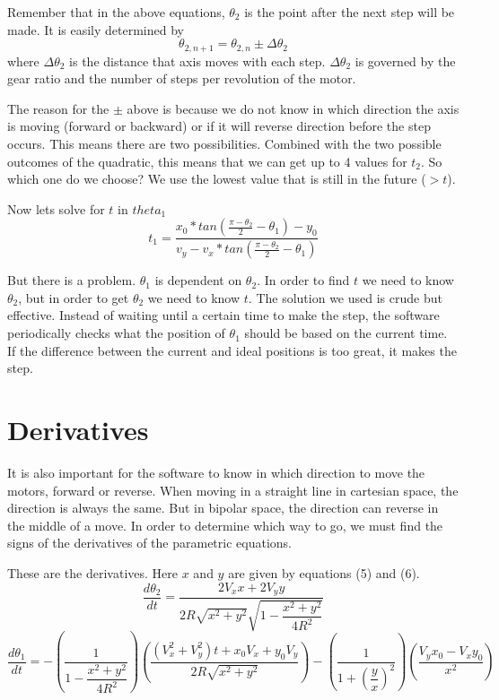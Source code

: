 \documentclass[12pt,letterpaper]{report}
\begin{document}
Remember that in the above equations, $\theta_2$ is the point after the next step will be made. It is easily determined by
\begin{equation}
	\theta_{2,n+1} = \theta_{2,n} \pm \Delta\theta_2
\end{equation}
where $\Delta\theta_2$ is the distance that axis moves with each step. $\Delta\theta_2$ is governed by the gear ratio and the number of steps per revolution of the motor.

The reason for the $\pm$ above is because we do not know in which direction the axis is moving (forward or backward) or if it will reverse direction before the step occurs. This means there are two possibilities. Combined with the two possible outcomes of the quadratic, this means that we can get up to 4 values for $t_2$. So which one do we choose? We use the lowest value that is still in the future ($> t$).

Now lets solve for $t$ in $theta_1$
\begin{equation}
	t_1 = \frac{x_0 * tan\left( \frac{\pi-\theta_2}{2} - \theta_1 \right) - y_0}{v_y - v_x * tan\left( \frac{\pi-\theta_2}{2} - \theta_1 \right)}
\end{equation}

But there is a problem. $\theta_1$ is dependent on $\theta_2$. In order to find $t$ we need to know $\theta_2$, but in order to get $\theta_2$ we need to know $t$. The solution we used is crude but effective. Instead of waiting until a certain time to make the step, the software periodically checks what the position of $\theta_1$ should be based on the current time. If the difference between the current and ideal positions is too great, it makes the step.

\section*{Derivatives}
It is also important for the software to know in which direction to move the motors, forward or reverse. When moving in a straight line in cartesian space, the direction is always the same. But in bipolar space, the direction can reverse in the middle of a move. In order to determine which way to go, we must find the signs of the derivatives of the parametric equations.

These are the derivatives. Here $x$ and $y$ are given by equations (5) and (6).
\begin{equation}
	\dfrac{d\theta_2}{dt} = \dfrac{2V_xx+2V_yy}{2R\sqrt{x^2+y^2}\sqrt{1-\dfrac{x^2+y^2}{4R^2}}}
\end{equation}
\begin{equation}
	\dfrac{d\theta_1}{dt} = -\left( \dfrac{1}{1-\dfrac{x^2+y^2}{4R^2}} \right) \left( \dfrac{(V_x^2+V_y^2)t+x_0V_x+y_0V_y}{2R\sqrt{x^2+y^2}} \right) - \left( \dfrac{1}{1+\left(\dfrac{y}{x}\right)^2} \right) \left( \dfrac{V_yx_0-V_xy_0}{x^2} \right) 
\end{equation}
\end{document}
